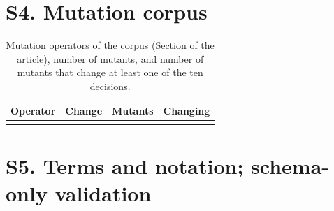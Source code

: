 \documentclass[10pt]{article}
\begin{document}
\begin{table}[H]
\begin{tabular}{@{}L{0.9cm}L{5.2cm}L{10.2cm}@{}}
\bottomrule
\end{tabular}
\end{table}



\clearpage
\section*{S4. Mutation corpus}

\begin{table}[H]
\caption{Mutation operators of the corpus (Section \ArtSecEvalDesign{} of the article), number of mutants, and number of mutants that change at least one of the ten decisions.}
\small
\centering
\begin{tabular}{@{}lL{7.0cm}rr@{}}
\toprule
\textbf{Operator} & \textbf{Change} & \textbf{Mutants} & \textbf{Changing} \\
\midrule
{}
\midrule
{}
\bottomrule
\end{tabular}
\end{table}

\section*{S5. Terms and notation; schema-only validation}
\end{document}

